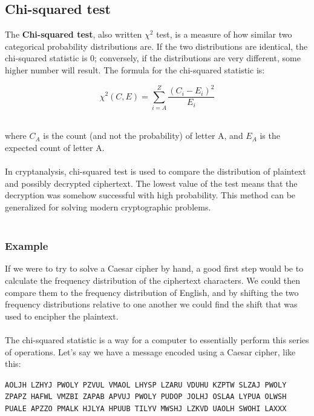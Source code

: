 \documentclass[Lau,binding=0.6cm,oneside]{sapthesis}
\begin{document}
\subsection{Chi-squared test}
The \textbf{Chi-squared test}, also written $\chi^{2}$ test, is a measure of how similar two categorical probability distributions are. If the two distributions are identical, the chi-squared statistic is 0; conversely, if the distributions are very different, some higher number will result. The formula for the chi-squared statistic is:

\begin{equation}
\chi^{2}(C, E) = \sum\limits_{i=A}^{Z} \frac{(C_i - E_i)^{2}}{E_i}
\end{equation}

\ \\
where $C_A$ is the count (and not the probability) of letter A, and $E_A$ is the expected count of letter A.\\\\
In cryptanalysis, chi-squared test is used to compare the distribution of plaintext and possibly decrypted ciphertext. The lowest value of the test means that the decryption was somehow successful with high probability. This method can be generalized for solving modern cryptographic problems.\\\\

\subsubsection{Example}
If we were to try to solve a Caesar cipher by hand, a good first step would be to calculate the frequency distribution of the ciphertext characters. We could then compare them to the frequency distribution of English, and by shifting the two frequency distributions relative to one another we could find the shift that was used to encipher the plaintext.\\\\
The chi-squared statistic is a way for a computer to essentially perform this series of operations. Let's say we have a message encoded using a Caesar cipher, like this:

\begin{displayquote}{\small{\texttt{AOLJH LZHYJ PWOLY PZVUL VMAOL LHYSP LZARU VDUHU KZPTW SLZAJ PWOLY ZPAPZ HAFWL VMZBI ZAPAB APVUJ PWOLY PUDOP JOLHJ OSLAA LYPUA OLWSH PUALE APZZO PMALK HJLYA HPUUB TILYV MWSHJ LZKVD UAOLH SWOHI LAXXX}}}
\end{displayquote}
\end{document}
